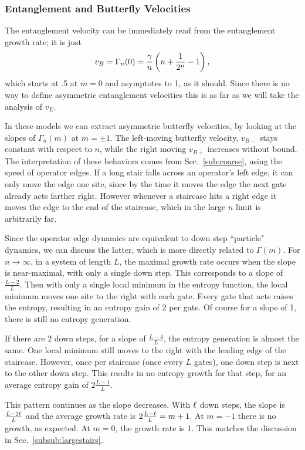 \subsubsection{Entanglement and Butterfly Velocities} \label{susub:vels}

The entanglement velocity can be immediately read from the entanglement growth rate; it is just 
\begin{align}
v_B=\Gamma_n(0)=\frac{\gamma}{n}\left(n+\frac{1}{2^n}-1\right),
\end{align}
which starts at .5 at $m=0$ and asymptotes to 1, as it should. Since there is no way to define asymmetric entanglement velocities this is as far as we will take the analysis of $v_E$.

In these models we can extract asymmetric butterfly velocities, by looking at the slopes of $\Gamma_n(m)$ at $m=\pm 1$. The left-moving butterfly velocity, $v_{B-}$ stays constant with respect to $n$, while the right moving $v_{B+}$ increases without bound. The interpretation of these behaviors comes from Sec.~\ref{sub:coarse}, using the speed of operator edges. If a long stair falls across an operator's left edge, it can only move the edge one site, since by the time it moves the edge the next gate already acts farther right. However whenever a staircase hits a right edge it moves the edge to the end of the staircase, which in the large $n$ limit is arbitrarily far.

Since the operator edge dynamics are equivalent to down step ``particle" dynamics, we can discuss the latter, which is more directly related to $\Gamma(m)$.
For $n\to\infty$, in a system of length $L$, the maximal growth rate occurs when the slope is near-maximal, with only a single down step. This corresponds to a slope of $\frac{L-2}{L}$. Then with only a single local minimum in the entropy function, the local minimum moves one site to the right with each gate. Every gate that acts raises the entropy, resulting in an entropy gain of 2 per gate. Of course for a slope of 1, there is still no entropy generation.

If there are 2 down steps, for a slope of $\frac{L-4}{L}$, the entropy generation is almost the same. One local minimum still moves to the right with the leading edge of the staircase. However, once per staircase (once every $L$ gates), one down step is next to the other down step. This results in no entropy growth for that step, for an average entropy gain of $2\frac{L-1}{L}$.

This pattern continues as the slope decreases. With $\ell$ down steps, the slope is $\frac{L-2\ell}{L}$ and the average growth rate is $2\frac{L-\ell}{L} = m+1$. At $m = -1$ there is no growth, as expected. At $m=0$, the growth rate is 1. This matches the discussion in Sec.~\ref{subsub:largestairs}.

